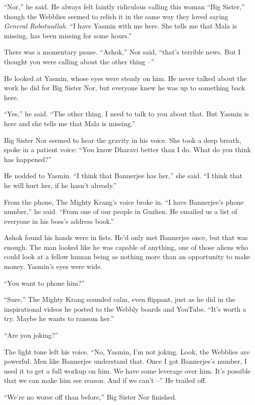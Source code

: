 ``Nor,'' he said. He always felt faintly ridiculous calling this
woman ``Big Sister,'' though the Webblies seemed to relish it in the
same way they loved saying \emph{General Robotwallah}. ``I have
Yasmin with me here. She tells me that Mala is missing, has been
missing for some hours.''

There was a momentary pause. ``Ashok,'' Nor said, ``that's terrible
news. But I thought you were calling about the other thing --''

He looked at Yasmin, whose eyes were steady on him. He never talked
about the work he did for Big Sister Nor, but everyone knew he was
up to something back here.

``Yes,'' he said. ``The other thing. I need to talk to you about that.
But Yasmin is here and she tells me that Mala is missing.''

Big Sister Nor seemed to hear the gravity in his voice. She took a
deep breath, spoke in a patient voice: ``You know Dharavi better
than I do. What do you think has happened?''

He nodded to Yasmin. ``I think that Bannerjee has her,'' she said. ``I
think that he will hurt her, if he hasn't already.''

From the phone, The Mighty Krang's voice broke in. ``I have
Bannerjee's phone number,'' he said. ``From one of our people in
Guzhen. He emailed us a list of everyone in his boss's address
book.''

Ashok found his hands were in fists. He'd only met Bannerjee once,
but that was enough. The man looked like he was capable of
anything, one of those aliens who could look at a fellow human
being as nothing more than an opportunity to make money. Yasmin's
eyes were wide.

``You want to phone him?''

``Sure,'' The Mighty Krang sounded calm, even flippant, just as he
did in the inspirational videos he posted to the Webbly boards and
YouTube. ``It's worth a try. Maybe he wants to ransom her.''

``Are you joking?''

The light tone left his voice. ``No, Yasmin, I'm not joking. Look,
the Webblies are powerful. Men like Bannerjee understand that. Once
I got Bannerjee's number, I used it to get a full workup on him. We
have some leverage over him. It's possible that we can make him see
reason. And if we can't --'' He trailed off.

``We're no worse off than before,'' Big Sister Nor finished.

